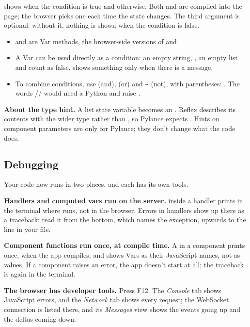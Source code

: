  shows  when the condition is true and  otherwise. Both  and  are compiled into the page; the browser picks one each time the state changes. The third argument is optional: without it, nothing is shown when the condition is false.

\begin{itemize}
\item {} and  are Var methods, the browser-side versions of  and .
\item A Var can be used directly as a condition: an empty string, , an empty list and  count as false.  shows something only when there is a message.
\item To combine conditions, use \cd{&} (and), \cd{|} (or) and \texttt{\textasciitilde} (not), with parentheses: . The words // would need a Python  and raise .
\end{itemize}

\textbf{About the type hint.} A list state variable becomes an . Reflex describes its contents with the wider type  rather than , so Pylance expects . Hints on component parameters are only for Pylance; they don't change what the code does.

\subsection{Debugging}

Your code now runs in two places, and each has its own tools.

\textbf{Handlers and computed vars run on the server.}  inside a handler prints in the terminal where  runs, not in the browser. Errors in handlers show up there as a traceback: read it from the bottom, which names the exception, upwards to the line in your file.

\textbf{Component functions run once, at compile time.} A  in a component prints once, when the app compiles, and shows Vars as their JavaScript names, not as values. If a component raises an error, the app doesn't start at all; the traceback is again in the terminal.

\textbf{The browser has developer tools.} Press F12. The \emph{Console} tab shows JavaScript errors, and the \emph{Network} tab shows every request; the WebSocket connection is listed there, and its \emph{Messages} view shows the events going up and the deltas coming down.

